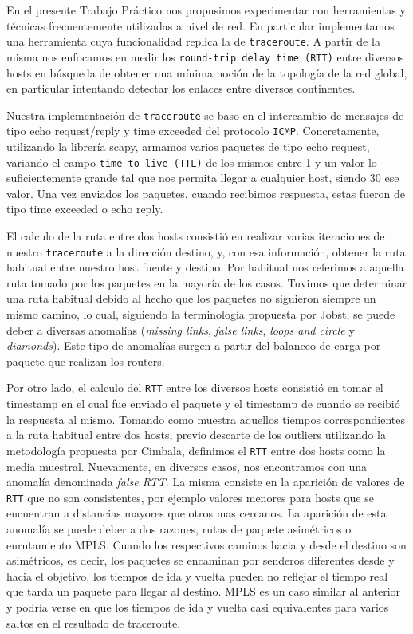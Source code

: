 En el presente Trabajo Práctico nos propusimos experimentar con herramientas y técnicas frecuentemente utilizadas a nivel de red. En particular implementamos una herramienta cuya funcionalidad replica la de \texttt{traceroute}. A partir de la misma nos enfocamos en medir los \texttt{round-trip delay time (RTT)} entre diversos hosts en búsqueda de obtener una mínima noción de la topología de la red global, en particular intentando detectar los enlaces entre diversos continentes.

Nuestra implementación de \texttt{traceroute} se baso en el intercambio de mensajes de tipo echo request/reply y time exceeded del protocolo \texttt{ICMP}\cite{rfc792}. Concretamente, utilizando la librería scapy, armamos varios paquetes de tipo echo request, variando el campo \texttt{time to live (TTL)} de los mismos entre 1 y un valor lo suficientemente grande tal que nos permita llegar a cualquier host, siendo 30 ese valor. Una vez enviados los paquetes, cuando recibimos respuesta, estas fueron de tipo time exceeded o echo reply.

El calculo de la ruta entre dos hosts consistió en realizar varias iteraciones de nuestro \texttt{traceroute} a la dirección destino, y, con esa información, obtener la ruta habitual entre nuestro host fuente y destino. Por habitual nos referimos a aquella ruta tomado por los paquetes en la mayoría de los casos. Tuvimos que determinar una ruta habitual debido al hecho que los paquetes no siguieron siempre un mismo camino, lo cual, siguiendo la terminología propuesta por Jobst\cite{Jobst}, se puede deber a diversas anomalías (\textit{missing links}, \textit{false links}, \textit{loops and circle} y \textit{diamonds}). Este tipo de anomalías surgen a partir del balanceo de carga por paquete que realizan los routers.

Por otro lado, el calculo del \texttt{RTT} entre los diversos hosts consistió en tomar el timestamp en el cual fue enviado el paquete y el timestamp de cuando se recibió la respuesta al mismo. Tomando como muestra aquellos tiempos correspondientes a la ruta habitual entre dos hosts, previo descarte de los outliers utilizando la metodología propuesta por Cimbala\cite{Cimbala}, definimos el \texttt{RTT} entre dos hosts como la media muestral. Nuevamente, en diversos casos, nos encontramos con una anomalía denominada \textit{false RTT}. La misma consiste en la aparición de valores de \texttt{RTT} que no son consistentes, por ejemplo valores menores para hosts que se encuentran a distancias mayores que otros mas cercanos. La aparición de esta anomalía se puede deber a dos razones, rutas de paquete asimétricos o enrutamiento MPLS. Cuando los respectivos caminos hacia y desde el destino son asimétricos, es decir, los paquetes se encaminan por senderos diferentes desde y hacia el objetivo, los tiempos de ida y vuelta pueden no reflejar el tiempo real que tarda un paquete para llegar al destino. MPLS es un caso similar al anterior y podría verse en que los tiempos de ida y vuelta casi equivalentes para varios saltos en el resultado de traceroute.

